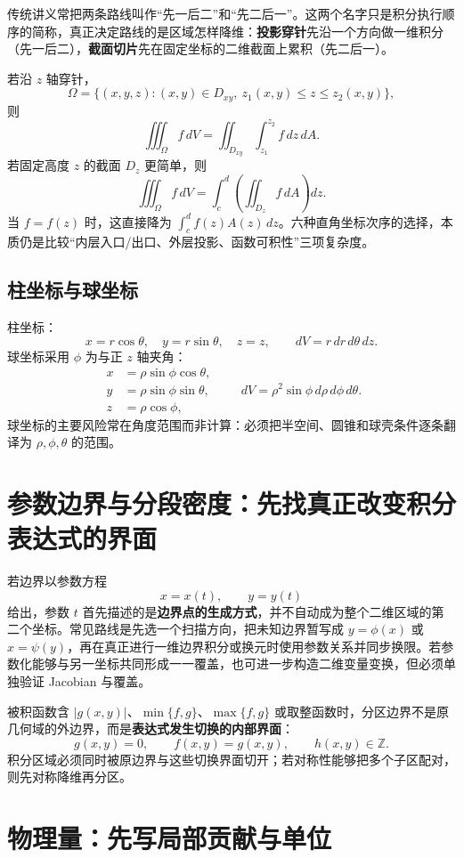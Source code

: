 \documentclass[11pt,a4paper,fontset=fandol]{ctexart}
\begin{document}
传统讲义常把两条路线叫作“先一后二”和“先二后一”。这两个名字只是积分执行顺序的简称，真正决定路线的是区域怎样降维：\textbf{投影穿针}先沿一个方向做一维积分（先一后二），\textbf{截面切片}先在固定坐标的二维截面上累积（先二后一）。

若沿 $z$ 轴穿针，
\[
\Omega=\{(x,y,z):(x,y)\in D_{xy},\ z_1(x,y)\le z\le z_2(x,y)\},
\]
则
\[
\iiint_\Omega f\,dV
=\iint_{D_{xy}}\int_{z_1}^{z_2}f\,dz\,dA.
\]
若固定高度 $z$ 的截面 $D_z$ 更简单，则
\[
\iiint_\Omega f\,dV
=\int_c^d\left(\iint_{D_z}f\,dA\right)dz.
\]
当 $f=f(z)$ 时，这直接降为 $\int_c^d f(z)A(z)\,dz$。六种直角坐标次序的选择，本质仍是比较“内层入口/出口、外层投影、函数可积性”三项复杂度。

\subsection{柱坐标与球坐标}

柱坐标：
\[
x=r\cos\theta,\quad y=r\sin\theta,\quad z=z,
\qquad dV=r\,dr\,d\theta\,dz.
\]
球坐标采用 $\phi$ 为与正 $z$ 轴夹角：
\[
\begin{aligned}
x&=\rho\sin\phi\cos\theta,\\
y&=\rho\sin\phi\sin\theta,\\
z&=\rho\cos\phi,
\end{aligned}
\qquad
dV=\rho^2\sin\phi\,d\rho\,d\phi\,d\theta.
\]
球坐标的主要风险常在角度范围而非计算：必须把半空间、圆锥和球壳条件逐条翻译为 $\rho,\phi,\theta$ 的范围。

\section{参数边界与分段密度：先找真正改变积分表达式的界面}

若边界以参数方程
\[
x=x(t),\qquad y=y(t)
\]
给出，参数 $t$ 首先描述的是\textbf{边界点的生成方式}，并不自动成为整个二维区域的第二个坐标。常见路线是先选一个扫描方向，把未知边界暂写成 $y=\phi(x)$ 或 $x=\psi(y)$，再在真正进行一维边界积分或换元时使用参数关系并同步换限。若参数化能够与另一坐标共同形成一一覆盖，也可进一步构造二维变量变换，但必须单独验证 Jacobian 与覆盖。

被积函数含 $\lvert g(x,y)\rvert$、$\min\{f,g\}$、$\max\{f,g\}$ 或取整函数时，分区边界不是原几何域的外边界，而是\textbf{表达式发生切换的内部界面}：
\[
g(x,y)=0,\qquad f(x,y)=g(x,y),\qquad h(x,y)\in\mathbb Z.
\]
积分区域必须同时被原边界与这些切换界面切开；若对称性能够把多个子区配对，则先对称降维再分区。

\section{物理量：先写局部贡献与单位}
\end{document}
